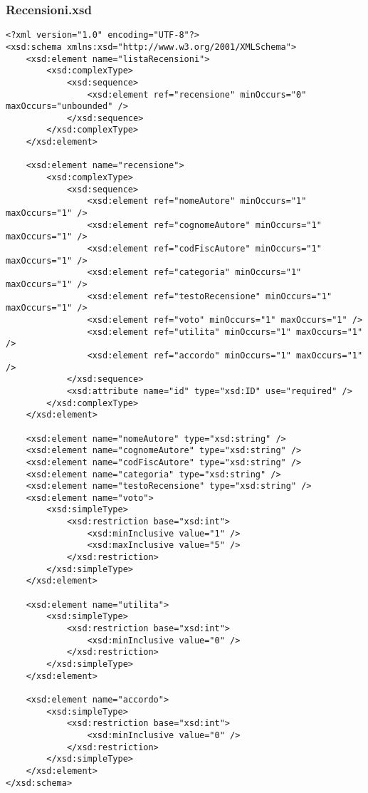 \documentclass [a4paper, 12pt]{book}
\begin{document}
\subsubsection{Recensioni.xsd}
\begin{lstlisting}[style=XML]
<?xml version="1.0" encoding="UTF-8"?>
<xsd:schema xmlns:xsd="http://www.w3.org/2001/XMLSchema">
    <xsd:element name="listaRecensioni">
        <xsd:complexType>
            <xsd:sequence>
                <xsd:element ref="recensione" minOccurs="0" maxOccurs="unbounded" />
            </xsd:sequence>
        </xsd:complexType>
    </xsd:element>

    <xsd:element name="recensione">
        <xsd:complexType>
            <xsd:sequence>
                <xsd:element ref="nomeAutore" minOccurs="1" maxOccurs="1" />
                <xsd:element ref="cognomeAutore" minOccurs="1"  maxOccurs="1" />
                <xsd:element ref="codFiscAutore" minOccurs="1" maxOccurs="1" />
                <xsd:element ref="categoria" minOccurs="1" maxOccurs="1" />
                <xsd:element ref="testoRecensione" minOccurs="1" maxOccurs="1" />
                <xsd:element ref="voto" minOccurs="1" maxOccurs="1" />
                <xsd:element ref="utilita" minOccurs="1" maxOccurs="1" />
                <xsd:element ref="accordo" minOccurs="1" maxOccurs="1" />
            </xsd:sequence>
            <xsd:attribute name="id" type="xsd:ID" use="required" />
        </xsd:complexType>
    </xsd:element>

    <xsd:element name="nomeAutore" type="xsd:string" />
    <xsd:element name="cognomeAutore" type="xsd:string" />
    <xsd:element name="codFiscAutore" type="xsd:string" />
    <xsd:element name="categoria" type="xsd:string" />
    <xsd:element name="testoRecensione" type="xsd:string" />
    <xsd:element name="voto">
        <xsd:simpleType>
            <xsd:restriction base="xsd:int">
                <xsd:minInclusive value="1" />
                <xsd:maxInclusive value="5" />
            </xsd:restriction>
        </xsd:simpleType>
    </xsd:element>

    <xsd:element name="utilita">
        <xsd:simpleType>
            <xsd:restriction base="xsd:int">
                <xsd:minInclusive value="0" />
            </xsd:restriction>
        </xsd:simpleType>
    </xsd:element>

    <xsd:element name="accordo">
        <xsd:simpleType>
            <xsd:restriction base="xsd:int">
                <xsd:minInclusive value="0" />
            </xsd:restriction>
        </xsd:simpleType>
    </xsd:element>
</xsd:schema>
\end{lstlisting}
\end{document}
